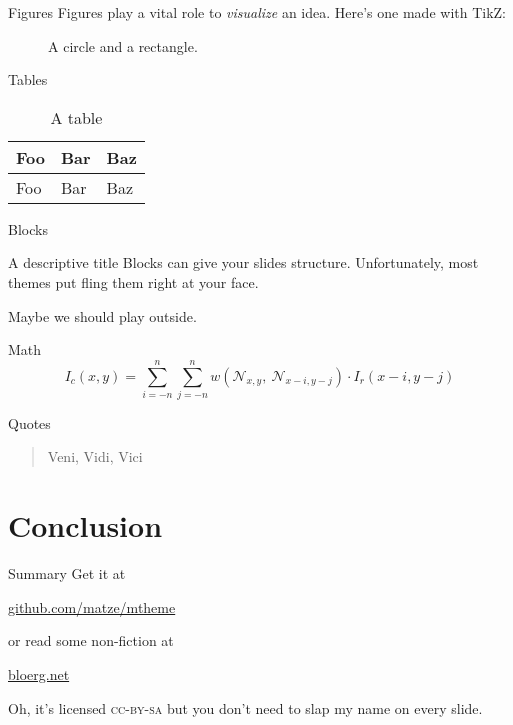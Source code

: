 \documentclass[compress]{beamer}
\begin{document}
\begin{frame}{Figures}
  Figures play a vital role to \emph{visualize} an idea. Here's one made with
  TikZ:

  \begin{figure}
    \caption{A circle and a rectangle.}
  \end{figure}
\end{frame}

\begin{frame}{Tables}
  \begin{table}
    \caption{A table}
    \begin{tabular}{lll}
      \toprule
      Foo & Bar & Baz\\
      \midrule
      Foo & Bar & Baz\\
      \bottomrule
    \end{tabular}
  \end{table}
\end{frame}

\begin{frame}{Blocks}

  \begin{block}{A descriptive title}
    Blocks can give your slides structure. Unfortunately, most themes put fling
    them right at your face.
  \end{block}

  Maybe we should play outside.

\end{frame}

\begin{frame}{Math}
  \begin{equation*}
    I_c(x,y) = \sum_{i=-n}^n\sum_{j=-n}^n w\left(
      \mathcal{N}_{x,y},\ \mathcal{N}_{x-i, y-j}\right)
      \cdot
      I_r(x-i,y-j)
  \end{equation*}
\end{frame}

\begin{frame}{Quotes}
  \begin{quote}
    Veni, Vidi, Vici
  \end{quote}
\end{frame}

\section{Conclusion}

\begin{frame}{Summary}
  Get it at

  \begin{center}\url{github.com/matze/mtheme}\end{center}

  or read some non-fiction at

  \begin{center}\url{bloerg.net}\end{center}

  Oh, it's licensed \textsc{cc-by-sa} but you don't need to slap my name on every slide.
\end{frame}

\end{document}
